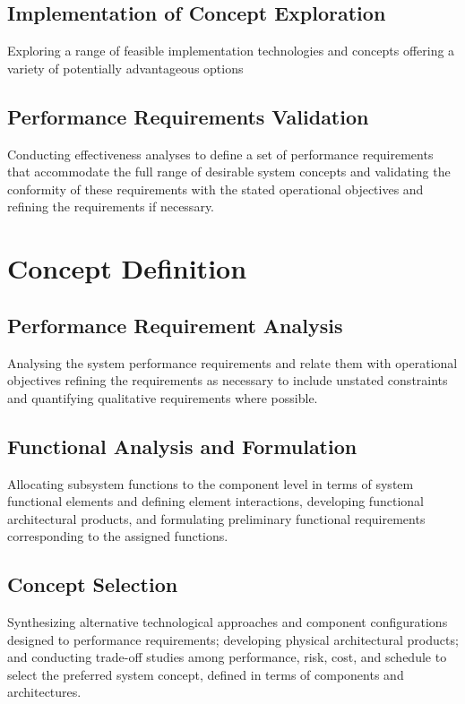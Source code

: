 \documentclass[a4paper,11pt,fleqn]{report}
\begin{document}
\subsection{Implementation of Concept Exploration}
Exploring a range of feasible implementation technologies and concepts offering a variety of potentially advantageous options 

\subsection{Performance Requirements Validation}
Conducting effectiveness analyses to define a set of performance requirements that accommodate the full range of desirable system concepts and validating the conformity of these requirements with the stated operational objectives and refining the requirements if necessary. 

\section{Concept Definition}
\subsection{Performance Requirement Analysis}
Analysing the system performance requirements and relate them with operational objectives refining the requirements as necessary to include unstated constraints and quantifying qualitative requirements where possible. 

\subsection{Functional Analysis and Formulation} 
Allocating subsystem functions to the component level in terms of system functional elements and defining element interactions, developing functional architectural products, and formulating preliminary functional requirements corresponding to the assigned functions. 

\subsection{Concept Selection}
Synthesizing alternative technological approaches and component configurations designed to performance requirements; developing physical architectural products; and conducting trade-off studies among performance, risk, cost, and schedule to select the preferred system concept, defined in terms of components and architectures. 
\end{document}
